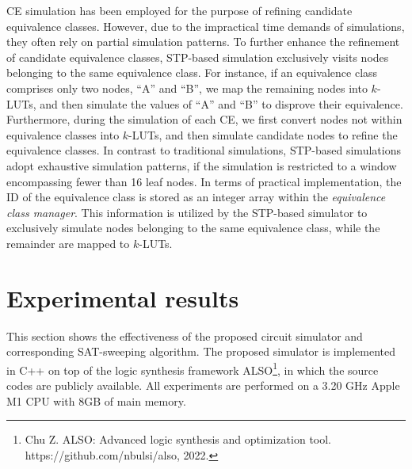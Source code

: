 \documentclass[conference]{IEEEtran}
\begin{document}
CE simulation has been employed for the purpose of refining candidate equivalence classes. 
However, due to the impractical time demands of simulations, they often rely on partial simulation patterns.
To further enhance the refinement of candidate equivalence classes, STP-based simulation exclusively visits nodes belonging to the same equivalence class. 
For instance, if an equivalence class comprises only two nodes, ``A'' and ``B'', we map the remaining nodes into $k$-LUTs, and then simulate the values of ``A'' and ``B'' to disprove their equivalence.
Furthermore, during the simulation of each CE, we first convert nodes not within equivalence classes into $k$-LUTs, and then simulate candidate nodes to refine the equivalence classes. 
In contrast to traditional simulations, STP-based simulations adopt exhaustive simulation patterns, if the simulation is restricted to a window encompassing fewer than 16 leaf nodes.
In terms of practical implementation, the ID of the equivalence class is stored as an integer array within the \emph{equivalence class manager}.
This information is utilized by the STP-based simulator to exclusively simulate nodes belonging to the same equivalence class, while the remainder are mapped to $k$-LUTs.

\vspace{-2mm}
\section{Experimental results}
\label{sec6}
This section shows the effectiveness of the proposed circuit simulator and corresponding SAT-sweeping algorithm.
The proposed simulator is implemented in C++ on top of the logic synthesis framework ALSO\footnote{Chu Z. ALSO: Advanced logic synthesis and optimization tool. https://github.com/nbulsi/also, 2022.}, in which the source codes are publicly available. 
All experiments are performed on a 3.20 GHz Apple M1 CPU with 8GB of main memory.
\end{document}
